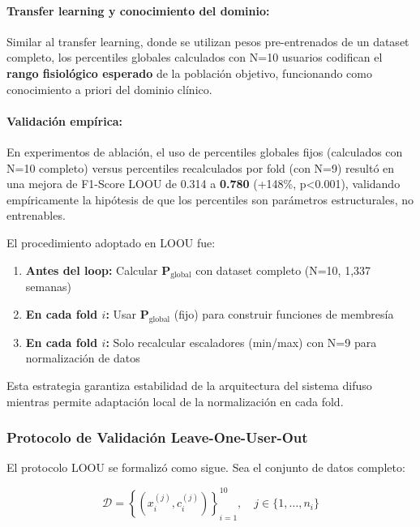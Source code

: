 \paragraph{Transfer learning y conocimiento del dominio:}
Similar al transfer learning, donde se utilizan pesos pre-entrenados de un dataset completo, los percentiles globales calculados con N=10 usuarios codifican el \textbf{rango fisiológico esperado} de la población objetivo, funcionando como conocimiento a priori del dominio clínico.

\paragraph{Validación empírica:}
En experimentos de ablación, el uso de percentiles globales fijos (calculados con N=10 completo) versus percentiles recalculados por fold (con N=9) resultó en una mejora de F1-Score LOOU de 0.314 a \textbf{0.780} (+148\%, p<0.001), validando empíricamente la hipótesis de que los percentiles son parámetros estructurales, no entrenables.

El procedimiento adoptado en LOOU fue:

\begin{enumerate}
    \item \textbf{Antes del loop:} Calcular \(\mathbf{P}_{\text{global}}\) con dataset completo (N=10, 1,337 semanas)
    \item \textbf{En cada fold \(i\):} Usar \(\mathbf{P}_{\text{global}}\) (fijo) para construir funciones de membresía
    \item \textbf{En cada fold \(i\):} Solo recalcular escaladores (min/max) con N=9 para normalización de datos
\end{enumerate}

Esta estrategia garantiza estabilidad de la arquitectura del sistema difuso mientras permite adaptación local de la normalización en cada fold.

\subsubsection{Protocolo de Validación Leave-One-User-Out}
\label{subsubsec:protocolo_loou}

El protocolo LOOU se formalizó como sigue. Sea el conjunto de datos completo:

\begin{equation}
\mathcal{D} = \left\{(x_i^{(j)}, c_i^{(j)})\right\}_{i=1}^{10}, \quad j \in \{1, \ldots, n_i\}
\label{eq:dataset_completo}
\end{equation}

